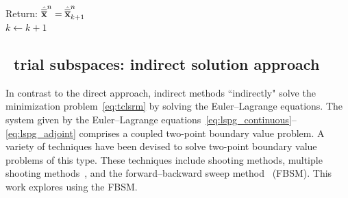\begin{algorithm}
{{Return: $\hat{\overline{\overline{\mathbf {x}}}}^{n} = \hat{\overline{\overline{\mathbf {x}}}}^{n}_{k+1} $ \\
}
$k\leftarrow k+1$
}
\end{algorithm}


%

\subsection{\spatialAcronym\ trial subspaces: indirect solution approach}\label{sec:indirect}
In contrast to the direct approach,
indirect methods ``indirectly" solve the minimization
problem~\eqref{eq:tclsrm} by solving the Euler--Lagrange equations. The
system given by the Euler--Lagrange equations~\eqref{eq:lspg_continuous}--\eqref{eq:lspg_adjoint} comprises a coupled two-point boundary value
problem. A variety of techniques have
been devised to solve two-point boundary value problems of this type. These
techniques include shooting methods, multiple shooting
methods~\cite{multiple_shooting}, and the forward--backward sweep
method~\cite{fbs} (FBSM).  This work explores using the FBSM. 


